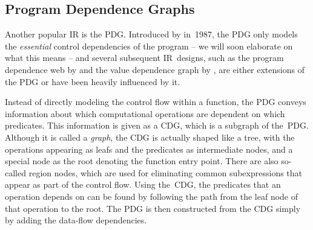 \subsection{Program Dependence Graphs}

Another popular \glsdesc{IR} is the \gls{PDG}.
%
Introduced by
\textcite{Ferrante1987} in~1987, the \gls{PDG} only models the \emph{essential}
control dependencies of the \gls{program} -- we will soon elaborate on what this
means -- and several subsequent \gls{IR}~designs, such as the \gls{program
  dependence web} by \textcite{Ballance1990} and the \gls{value dependence
  graph} by \textcite{Weise1994}, are either extensions of the \gls{PDG} or have
been heavily influenced by it.

Instead of directly modeling the control flow within a \gls{function}, the
\gls{PDG} conveys information about which computational operations are dependent
on which predicates.
%
This information is given as a \gls{CDG}, which is a
\gls{subgraph} of the~\gls{PDG}.
%
Although it is called a \emph{\gls{graph}}, the
\gls{CDG} is actually shaped like a \gls{tree}, with the operations appearing as
\glspl{leaf} and the predicates as intermediate \glspl{node}, and a special
\gls{node} as the \gls{root} denoting the \gls{function} entry point.
%
There are
also so-called \glspl{region node}, which are used for eliminating common
subexpressions that appear as part of the control flow.
%
Using the~\gls{CDG}, the
predicates that an operation depends on can be found by following the \gls{path}
from the \gls{leaf} \gls{node} of that operation to the \gls{root}.
%
The
\gls{PDG} is then constructed from the \gls{CDG} simply by adding the data-flow
dependencies.

